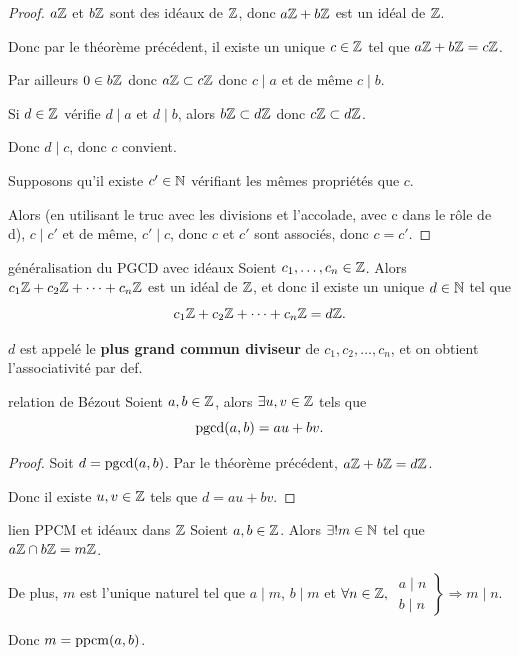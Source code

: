 \begin{proof}
    $a \mathbb{Z}$ et $b \mathbb{Z}$ sont des idéaux de $\mathbb{Z}$, donc $a \mathbb{Z} + b \mathbb{Z}$ est un idéal de $\mathbb{Z}$.

    Donc par le théorème précédent, il existe un unique $c \in \mathbb{Z}$ tel que $a \mathbb{Z} + b \mathbb{Z} = c \mathbb{Z}$.

    Par ailleurs $0 \in b \mathbb{Z}$ donc $a \mathbb{Z} \subset c \mathbb{Z}$ donc $c \mid a $ et de même $c \mid b$.

    Si $d \in \mathbb{Z}$ vérifie $d \mid a$ et $d \mid b$, alors $b \mathbb{Z} \subset d \mathbb{Z}$ donc $c \mathbb{Z} \subset d \mathbb{Z}$. 

    Donc $d \mid c$, donc $c $ convient. 

    \svspace Supposons qu'il existe $c' \in \mathbb{N}$ vérifiant les mêmes propriétés que $c$. 

    Alors (en utilisant le truc avec les divisions et l'accolade, avec c dans le rôle de d), 
    $c \mid c'$ et de même, $c' \mid c$, donc $c$ et $c'$ sont associés, donc $c = c'$.
\end{proof}


\begin{proposition}{généralisation du PGCD avec idéaux}{}
    Soient $c_1, \ldots, c_n \in \mathbb{Z}$. Alors $c_1 \mathbb{Z} + c_2 \mathbb{Z} + \cdots + c_n \mathbb{Z}$ est un 
    idéal de $\mathbb{Z}$, et donc il existe un unique $d \in \mathbb{N}$ tel que 
    \[
        c_1 \mathbb{Z} + c_2 \mathbb{Z} + \cdots + c_n \mathbb{Z} = d \mathbb{Z}.
    \]

    $d$ est appelé le \textbf{plus grand commun diviseur} de $c_1, c_2, \ldots, c_n$, et 
    on obtient l'associativité par def. 
\end{proposition}

\begin{proposition}{relation de Bézout}{}
    Soient $a, b \in \mathbb{Z}$, alors $\exists u, v \in \mathbb{Z}$ tels que 
    \[
        \operatorname{pgcd}(a, b) = au + bv.
    \]
\end{proposition}

\begin{proof}
    Soit $d = \operatorname{pgcd}(a, b)$. Par le théorème précédent, $a \mathbb{Z} + b \mathbb{Z} = d \mathbb{Z}$.

    Donc il existe $u, v \in \mathbb{Z}$ tels que $d = au + bv$.
\end{proof}

\begin{theoreme}{lien PPCM et idéaux dans $\mathbb{Z}$}{}
    Soient $a, b \in \mathbb{Z}$. Alors $\exists ! m \in \mathbb{N}$ tel que $a \mathbb{Z} \cap b \mathbb{Z} = m \mathbb{Z}$.

    De plus, $m$ est l'unique naturel tel que $a \mid m$, $b \mid m$ et 
    $\forall n \in \mathbb{Z},$
    $\left. \begin{aligned}
        a \mid n \\
        b \mid n    
    \end{aligned} \right\} \Rightarrow m \mid n$.

    Donc $m = \operatorname{ppcm}(a, b)$.
\end{theoreme}

